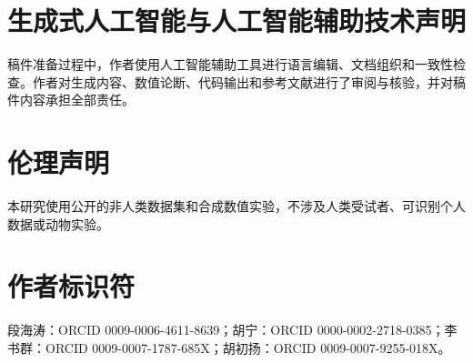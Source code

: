 \documentclass[UTF8,11pt]{ctexart}
\begin{document}
\section*{生成式人工智能与人工智能辅助技术声明}
稿件准备过程中，作者使用人工智能辅助工具进行语言编辑、文档组织和一致性检查。作者对生成内容、数值论断、代码输出和参考文献进行了审阅与核验，并对稿件内容承担全部责任。

\section*{伦理声明}
本研究使用公开的非人类数据集和合成数值实验，不涉及人类受试者、可识别个人数据或动物实验。

\section*{作者标识符}
段海涛：ORCID 0009-0006-4611-8639；胡宁：ORCID 0000-0002-2718-0385；李书群：ORCID 0009-0007-1787-685X；胡初扬：ORCID 0009-0007-9255-018X。



\end{document}
